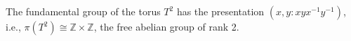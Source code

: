 The fundamental group of the torus $T^2$ has the presentation $(x, y : xyx^{-1}y^{-1})$, i.e., $\pi(T^2) \cong \mathbb{Z} \times \mathbb{Z}$, the free abelian group of rank 2.
